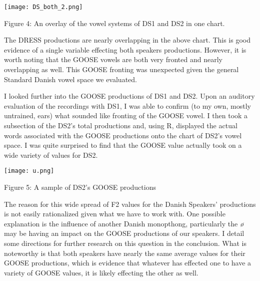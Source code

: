     \bigskip
    
     \bigskip

    \begin{figure4}
    \centering    
    \texttt{[image: DS\_both\_2.png]}
   
    \caption{Figure 4: An overlay of the vowel systems of DS1 and DS2 in one chart.}
    \par
    \end{figure4}

    \bigskip 
    
    The DRESS productions are nearly overlapping in the above chart. This is good evidence of a single variable effecting both speakers productions. However, it is worth noting that the GOOSE vowels are both very fronted and nearly overlapping as well. This GOOSE fronting was unexpected given the general Standard Danish vowel space we evaluated. 
    
    \bigskip
    
    I looked further into the GOOSE productions of DS1 and DS2. Upon an auditory evaluation of the recordings with DS1, I was able to confirm (to my own, mostly untrained, ears) what sounded like fronting of the GOOSE vowel. I then took a subsection of the DS2's total productions and, using R, displayed the actual words associated with the GOOSE productions onto the chart of DS2's vowel space. I was quite surprised to find that the GOOSE value actually took on a wide variety of values for DS2.
    
      \bigskip

    \begin{figure5}
    \centering    
    \texttt{[image: u.png]}
   
    \caption{Figure 5: A sample of DS2's GOOSE productions}
    \par
    \end{figure5}

    \bigskip 

The reason for this wide spread of F2 values for the Danish Speakers' productions is not easily rationalized given what we have to work with. One possible explanation is the influence of another Danish monopthong, particularly the \emph{{\o}} may be having an impact on the GOOSE productions of our speakers. I detail some directions for further research on this question in the conclusion. What is noteworthy is that both speakers have nearly the same average values for their GOOSE productions, which is evidence that whatever has effected one to have a variety of GOOSE values, it is likely effecting the other as well.
  

